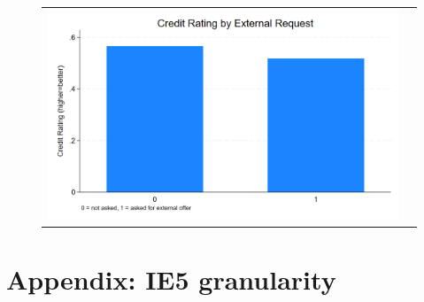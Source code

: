 \documentclass[12pt]{article}
\begin{document}
\begin{figure}[H]
\caption{}
\label{fig:ie11_4}
\centering{}%
\begin{tabular}{cc}
\includegraphics[scale=0.27]{../figures/IE11/IE11_bar_external_by_creditrating.png} 
\end{tabular}
\end{figure}

\newpage 






\newpage


\section{Appendix: IE5 granularity}\label{sec:appendix_ie5}








\end{document}
